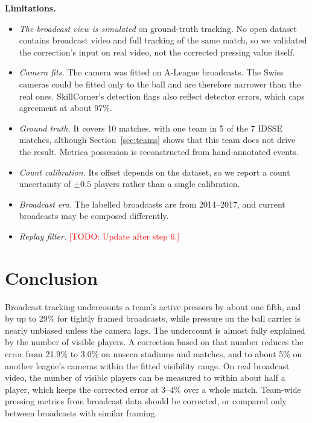 \documentclass[11pt]{article}
\newcommand{\todo}[1]{\textcolor{red}{[TODO: #1]}}
\begin{document}
\textbf{Limitations.}
\begin{itemize}
\item \emph{The broadcast view is simulated} on ground-truth tracking. No open dataset contains broadcast video and
full tracking of the same match, so we validated the correction's input on real video, not the corrected pressing
value itself.
\item \emph{Camera fits.} The camera was fitted on A-League broadcasts. The Swiss cameras could be fitted only to the
ball and are therefore narrower than the real ones. SkillCorner's detection flags also reflect detector errors, which
caps agreement at about 97\%.
\item \emph{Ground truth.} It covers 10 matches, with one team in 5 of the 7 IDSSE matches, although
Section~\ref{sec:teams} shows that this team does not drive the result. Metrica possession is reconstructed from
hand-annotated events.
\item \emph{Count calibration.} Its offset depends on the dataset, so we report a count uncertainty of
$\pm 0.5$ players rather than a single calibration.
\item \emph{Broadcast era.} The labelled broadcasts are from 2014--2017, and current broadcasts may be composed
differently.
\item \emph{Replay filter.} \todo{Update after step 6.}
\end{itemize}

\section{Conclusion}

Broadcast tracking undercounts a team's active pressers by about one fifth, and by up to 29\% for tightly framed
broadcasts, while pressure on the ball carrier is nearly unbiased unless the camera lags. The undercount is almost
fully explained by the number of visible players. A correction based on that number reduces the error from 21.9\% to
3.0\% on unseen stadiums and matches, and to about 5\% on another league's cameras within the fitted visibility
range. On real broadcast video, the number of visible players can be measured to within about half a player, which
keeps the corrected error at 3--4\% over a whole match. Team-wide pressing metrics from broadcast data should be
corrected, or compared only between broadcasts with similar framing.
\end{document}
